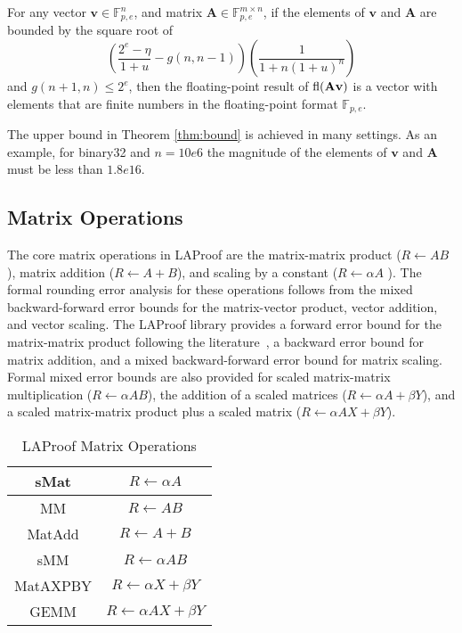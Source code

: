 \begin{theorem} For any vector
${\textbf{v}} \in \mathbb{F}_{p,e}^n$,
and matrix ${\bm{ A}} \in \mathbb{F}_{p,e}^{m\times n}$, if the elements of ${\textbf{v}}$ and ${\bm{ A}}$ are bounded by the square root of
\begin{equation}
 \left(\frac{2^{e} - \eta}{1+u} - g(n,n-1)\right) \left(\frac{1}{1 + n(1+u)^n}\right)   \label{eq:bound} 
\end{equation}
and $g(n+1,n) \le  2^e$, then the floating-point result of $\operatorname{fl}({\textbf{A}} {\textbf{v}})$ is a vector with elements that are finite numbers in the floating-point format $\mathbb{F}_{p,e}$.   \label{thm:bound} 
\end{theorem}
The upper bound in Theorem \ref{thm:bound} is achieved in many settings.
As an example, for binary32 and $n = 10{e6}$ the magnitude of
the elements of $\mathbf{v}$ and $\mathbf{A}$ must be less than $1.8{e16}$.

\subsection{Matrix Operations}\label{sec:mat} 
The core matrix operations in LAProof are the matrix-matrix
product ($R \leftarrow A B$), matrix addition ($R \leftarrow A +  B$), and scaling by a constant ($R \leftarrow \alpha A $ ). The formal rounding error analysis for these operations follows from the mixed backward-forward error bounds for the matrix-vector product, vector addition, and vector scaling. The LAProof library provides a forward error bound for the matrix-matrix product
following the literature~\cite{stewart_book,higham_book}, a backward error bound for matrix addition, and a mixed backward-forward error bound for matrix scaling.  Formal mixed error bounds are also provided for scaled matrix-matrix multiplication ($R \leftarrow \alpha AB$), the addition of a scaled matrices ($R \leftarrow \alpha A  + \beta Y$), and a scaled matrix-matrix product plus a scaled matrix {($R \leftarrow \alpha AX  + \beta Y$).} 

\begin{table}[htbp]
\caption{LAProof Matrix Operations}
\label{tab:matops}
\begin{center}
\setlength{\tabcolsep}{0.5em} %
{\renewcommand{\arraystretch}{1.4}%
\begin{tabular}{|c|c|}
\hline
    sMat & $R \leftarrow \alpha A $   \\
\hline
    MM & $R \leftarrow  A B$   \\
\hline         
MatAdd &  $R \leftarrow A +  B$    \\ 
\hline
\hline
sMM & $R \leftarrow \alpha AB $   \\
\hline
MatAXPBY &  $R \leftarrow \alpha X  + \beta Y$   \\ 
\hline
GEMM &  $R \leftarrow \alpha AX  + \beta Y$   \\ 
\hline
     \end{tabular} }
\end{center}
\end{table}

